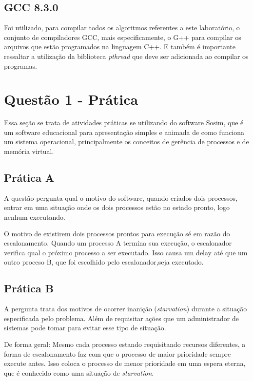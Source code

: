 \documentclass[12pt]{report}
\begin{document}
{\subsection{GCC 8.3.0}
Foi utilizado, para compilar todos os algoritmos referentes a este laboratório, o conjunto de compiladores GCC, mais especificamente, o G++ para compilar os arquivos que estão programados na linguagem C++. E também é importante ressaltar a utilização da biblioteca \textit{pthread} que deve ser adicionada ao compilar os programas.



\section{Questão 1 - Prática}
Essa seção se trata de atividades práticas se utilizando do software Sosim, que é um software educacional para apresentação simples e animada de como funciona um sistema operacional, principalmente os conceitos de gerência de processos e de memória virtual.

\subsection{Prática A}

A questão pergunta qual o motivo do software, quando criados dois processos, entrar em uma situação onde os dois processos estão no estado pronto, logo nenhum executando.

O motivo de existirem dois processos prontos para execução sé em razão do escalonamento. Quando um processo A termina sua execução, o escalonador verifica qual o próximo processo a ser executado. Isso causa um delay até que um outro proceso B, que foi escolhido pelo escalonador,seja executado.

\subsection{Prática B}
A pergunta trata dos motivos de ocorrer inanição (\textit{starvation}) durante a situação especificada pelo problema. Além de requisitar ações que um administrador de sistemas pode tomar para evitar esse tipo de situação.

De forma geral: Mesmo cada processo estando requisitando recursos diferentes, a forma de escalonamento faz com que o processo de maior prioridade sempre execute antes. Isso coloca o processo de menor prioridade em uma espera eterna, que é conhecido como uma situação de \textit{starvation}.

}
\end{document}
